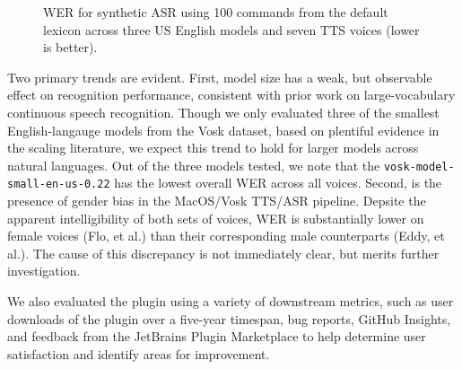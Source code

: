 \documentclass[conference]{IEEEtran}
\begin{document}
\begin{figure}[ht!]
    \centering
    \begin{table}
    \end{table}
    \caption{WER for synthetic ASR using 100 commands from the default lexicon across three US English models and seven TTS voices (lower is better).}
    \label{fig:fig1}
\end{figure}

Two primary trends are evident. First, model size has a weak, but observable effect on recognition performance, consistent with prior work on large-vocabulary continuous speech recognition. Though we only evaluated three of the smallest English-langauge models from the Vosk dataset, based on plentiful evidence in the scaling literature, we expect this trend to hold for larger models across natural languages. Out of the three models tested, we note that the \texttt{vosk-model-small-en-us-0.22} has the lowest overall WER across all voices. Second, is the presence of gender bias in the MacOS/Vosk TTS/ASR pipeline. Depsite the apparent intelligibility of both sets of voices, WER is substantially lower on female voices (Flo, et al.) than their corresponding male counterparts (Eddy, et al.). The cause of this discrepancy is not immediately clear, but merits further investigation.

We also evaluated the plugin using a variety of downstream metrics, such as user downloads of the plugin over a five-year timespan, bug reports, GitHub Insights, and feedback from the JetBrains Plugin Marketplace to help determine user satisfaction and identify areas for improvement.
\end{document}
